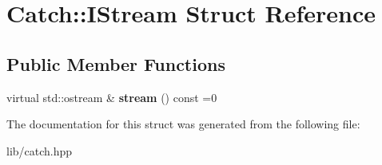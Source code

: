 \hypertarget{struct_catch_1_1_i_stream}{}\section{Catch\+:\+:I\+Stream Struct Reference}
\label{struct_catch_1_1_i_stream}
\subsection*{Public Member Functions}
\begin{DoxyCompactItemize}
\item 
\mbox{\label{struct_catch_1_1_i_stream_a55a9ddbe250261ff38642f480ebdd902}} 
virtual std\+::ostream \& {\bfseries stream} () const =0
\end{DoxyCompactItemize}


The documentation for this struct was generated from the following file\+:\begin{DoxyCompactItemize}
\item 
lib/catch.\+hpp\end{DoxyCompactItemize}
